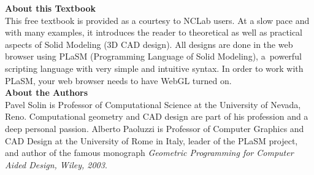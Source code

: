 \documentclass{article}
\begin{document}
\pagestyle{empty}







\newpage
\vbox{}
\newpage
\vbox{}
\newpage





\noindent
{\bf About this Textbook}\\[4mm]
This free textbook is provided as a courtesy to NCLab users. At a slow pace
and with many examples, it introduces the reader to theoretical as well as
practical aspects of Solid Modeling (3D CAD design). All designs are done in the web 
browser using PLaSM (Programming Language of Solid Modeling), a~powerful 
scripting language with very simple and intuitive syntax. In order to work 
with PLaSM, your web browser needs to have WebGL turned on.\\[12mm]

\noindent
{\bf About the Authors}\\[4mm]
Pavel Solin is Professor of Computational Science at the University of Nevada, Reno. 
Computational geometry and CAD design are part of his profession and a deep personal 
passion. Alberto Paoluzzi is Professor of Computer Graphics and CAD Design at the 
University of Rome in Italy, leader of the PLaSM project, and author of the famous 
monograph {\em Geometric Programming for Computer Aided Design, Wiley, 2003}.\\[12mm]

%
%
\end{document}

